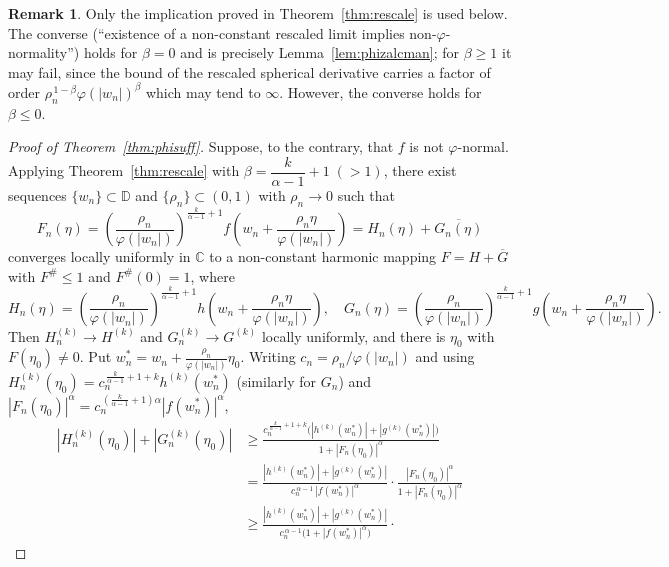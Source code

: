 \documentclass[11pt,reqno]{amsart}
\theoremstyle{definition}
\newtheorem{remark}[theorem]{Remark}
\newcommand{\D}{\mathbb{D}}
\newcommand{\C}{\mathbb{C}}
\begin{document}
\begin{remark}\label{rem:converse}
Only the implication proved in Theorem~\ref{thm:rescale} is used below. The converse
(``existence of a non-constant rescaled limit implies non-$\varphi$-normality'') holds for
$\beta=0$ and is precisely Lemma~\ref{lem:phizalcman}; for $\beta\ge1$ it may fail, since the bound of the rescaled spherical derivative carries a factor of order
$\rho_{n}^{\,1-\beta}\varphi(|w_{n}|)^{\beta}$ which may tend to $\infty.$  However, the converse holds for $\beta\leq 0.$ 
\end{remark}

\begin{proof}[Proof of Theorem~\textup{\ref{thm:phisuff}}]
Suppose, to the contrary, that $f$ is not $\varphi$-normal. Applying
Theorem~\ref{thm:rescale} with $\beta=\dfrac{k}{\alpha-1}+1\;(>1)$, there exist sequences
$\{w_{n}\}\subset\D$ and $\{\rho_{n}\}\subset(0,1)$ with $\rho_{n}\to0$ such that
\[
F_{n}(\eta)=\left(\frac{\rho_{n}}{\varphi(|w_{n}|)}\right)^{\frac{k}{\alpha-1}+1}
f\!\left(w_{n}+\frac{\rho_{n}\eta}{\varphi(|w_{n}|)}\right)
=H_{n}(\eta)+\overline{G_{n}(\eta)}
\]
converges locally uniformly in $\C$ to a non-constant harmonic mapping
$F=H+\overline G$ with $F^{\#}\le1$ and $F^{\#}(0)=1$, where
\[
H_{n}(\eta)=\left(\frac{\rho_{n}}{\varphi(|w_{n}|)}\right)^{\frac{k}{\alpha-1}+1}
h\!\left(w_{n}+\frac{\rho_{n}\eta}{\varphi(|w_{n}|)}\right),\quad
G_{n}(\eta)=\left(\frac{\rho_{n}}{\varphi(|w_{n}|)}\right)^{\frac{k}{\alpha-1}+1}
g\!\left(w_{n}+\frac{\rho_{n}\eta}{\varphi(|w_{n}|)}\right).
\]
Then $H_{n}^{(k)}\to H^{(k)}$ and $G_{n}^{(k)}\to G^{(k)}$ locally uniformly, and there is
$\eta_{0}$ with $F(\eta_{0})\neq0$. Put $w_{n}^{*}=w_{n}+\tfrac{\rho_{n}}{\varphi(|w_{n}|)}\eta_{0}$.
Writing $c_{n}=\rho_{n}/\varphi(|w_{n}|)$ and using
$H_{n}^{(k)}(\eta_{0})=c_{n}^{\,\frac{k}{\alpha-1}+1+k}h^{(k)}(w_{n}^{*})$ (similarly for
$G_{n}$) and $|F_{n}(\eta_{0})|^{\alpha}=c_{n}^{\,(\frac{k}{\alpha-1}+1)\alpha}|f(w_{n}^{*})|^{\alpha}$,
\begin{align*}
|H_{n}^{(k)}(\eta_{0})|+|G_{n}^{(k)}(\eta_{0})|
&\ge\frac{c_{n}^{\,\frac{k}{\alpha-1}+1+k}\big(|h^{(k)}(w_{n}^{*})|+|g^{(k)}(w_{n}^{*})|\big)}
{1+|F_{n}(\eta_{0})|^{\alpha}}\\[0.4ex]
&=\frac{|h^{(k)}(w_{n}^{*})|+|g^{(k)}(w_{n}^{*})|}{c_{n}^{\,\alpha-1}\,|f(w_{n}^{*})|^{\alpha}}\cdot
\frac{|F_{n}(\eta_{0})|^{\alpha}}{1+|F_{n}(\eta_{0})|^{\alpha}}\\[0.4ex]
&\ge\frac{|h^{(k)}(w_{n}^{*})|+|g^{(k)}(w_{n}^{*})|}
{c_{n}^{\,\alpha-1}\big(1+|f(w_{n}^{*})|^{\alpha}\big)}\cdot

\end{align*}
\end{proof}
\end{document}
